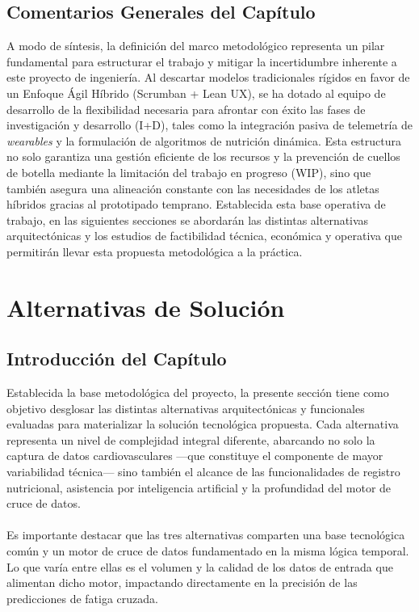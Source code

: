 \documentclass[12pt]{article}
\begin{document}
\subsection{Comentarios Generales del Capítulo}

A modo de síntesis, la definición del marco metodológico representa un pilar fundamental para estructurar el trabajo y mitigar la incertidumbre inherente a este proyecto de ingeniería. Al descartar modelos tradicionales rígidos en favor de un Enfoque Ágil Híbrido (Scrumban + Lean UX), se ha dotado al equipo de desarrollo de la flexibilidad necesaria para afrontar con éxito las fases de investigación y desarrollo (I+D), tales como la integración pasiva de telemetría de \textit{wearables} y la formulación de algoritmos de nutrición dinámica. Esta estructura no solo garantiza una gestión eficiente de los recursos y la prevención de cuellos de botella mediante la limitación del trabajo en progreso (WIP), sino que también asegura una alineación constante con las necesidades de los atletas híbridos gracias al prototipado temprano. Establecida esta base operativa de trabajo, en las siguientes secciones se abordarán las distintas alternativas arquitectónicas y los estudios de factibilidad técnica, económica y operativa que permitirán llevar esta propuesta metodológica a la práctica.
\newpage
\section{Alternativas de Solución}
\subsection{Introducción del Capítulo}
Establecida la base metodológica del proyecto, la presente sección tiene como objetivo desglosar las distintas alternativas arquitectónicas y funcionales evaluadas para materializar la solución tecnológica propuesta. Cada alternativa representa un nivel de complejidad integral diferente, abarcando no solo la captura de datos cardiovasculares ---que constituye el componente de mayor variabilidad técnica--- sino también el alcance de las funcionalidades de registro nutricional, asistencia por inteligencia artificial y la profundidad del motor de cruce de datos.
\\\\
Es importante destacar que las tres alternativas comparten una base tecnológica común y un motor de cruce de datos fundamentado en la misma lógica temporal. Lo que varía entre ellas es el volumen y la calidad de los datos de entrada que alimentan dicho motor, impactando directamente en la precisión de las predicciones de fatiga cruzada.
\end{document}
